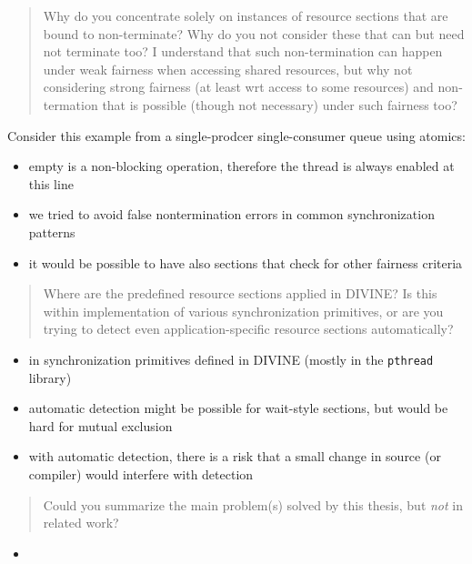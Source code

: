 \documentclass[aspectratio=169, fi]{paradise-slide}
\newcommand{\rquote}[1]{\begin{quote}#1\end{quote}\bigskip\setlength{\leftmargini}{1em}}
\begin{document}
\begin{frame}[fragile]{\qtitle}
  \rquote{Why do you concentrate solely on instances of resource sections that are bound to
    non-terminate? Why do you not consider these that can but need not terminate too? I understand
    that such non-termination can happen under weak fairness when accessing shared resources, but
    why not considering strong fairness (at least wrt access to some resources) and non-termation
    that is possible (though not necessary) under such fairness too?}

  Consider this example from a single-prodcer single-consumer queue using atomics:
  \begin{cppcode}
    T &front() {
        while ( empty() ) { /* wait */ }
        // ...
  \end{cppcode}
  \begin{itemize}
    \item empty is a non-blocking operation, therefore the thread is always enabled at this line
    \item we tried to avoid false nontermination errors in common synchronization patterns
    \item it would be possible to have also sections that check for other fairness criteria
  \end{itemize}
\end{frame}

\begin{frame}{\qtitle}
  \rquote{Where are the predefined resource sections applied in DIVINE? Is this within
    implementation of various synchronization primitives, or are you trying to detect even
    application-specific resource sections automatically?}

  \begin{itemize}
    \item in synchronization primitives defined in DIVINE (mostly in the \texttt{pthread} library)
    \item automatic detection might be possible for wait-style sections, but would be hard for
      mutual exclusion
    \item with automatic detection, there is a risk that a small change in source (or compiler)
      would interfere with detection
  \end{itemize}
\end{frame}

\def\rname{Jaco van de Pol}

\begin{frame}{\qtitle}
  \rquote{Could you summarize the main problem(s) solved by this thesis, but \emph{not} in related
    work?}
  \begin{itemize}
    \item 
  \end{itemize}
\end{frame}
\end{document}
